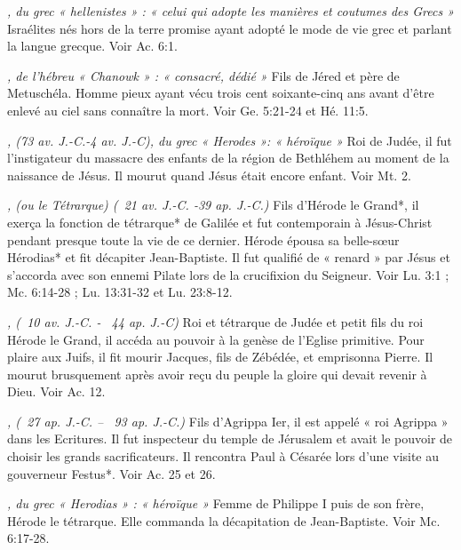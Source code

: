 \begin{multicols}{2}
{\textit{, du grec « hellenistes » : « celui qui adopte les manières et coutumes des Grecs »}\newline
Israélites nés hors de la terre promise ayant adopté le mode de vie grec et parlant la langue grecque. Voir Ac. 6:1.

\textit{, de l'hébreu « Chanowk » : « consacré, dédié »}\newline
Fils de Jéred et père de Metuschéla. Homme pieux ayant vécu trois cent soixante-cinq ans avant d'être enlevé au ciel sans connaître la mort. Voir Ge. 5:21-24 et Hé. 11:5.

\textit{, (73 av. J.-C.-4 av. J.-C), du grec « Herodes »: « héroïque »}\newline
Roi de Judée, il fut l'instigateur du massacre des enfants de la région de Bethléhem au moment de la naissance de Jésus. Il mourut quand Jésus était encore enfant. Voir Mt. 2.

\textit{, (ou le Tétrarque) (\ 21 av. J.-C. -39 ap. J.-C.)}\newline
Fils d'Hérode le Grand*, il exerça la fonction de tétrarque* de Galilée et fut contemporain à Jésus-Christ pendant presque toute la vie de ce dernier. Hérode épousa sa belle-sœur Hérodias* et fit décapiter Jean-Baptiste. Il fut qualifié de « renard » par Jésus et s'accorda avec son ennemi Pilate lors de la crucifixion du Seigneur. Voir Lu. 3:1 ; Mc. 6:14-28 ; Lu. 13:31-32 et Lu. 23:8-12.

\textit{, (\ 10 av. J.-C. - \ 44 ap. J.-C)}\newline
Roi et tétrarque de Judée et petit fils du roi Hérode le Grand, il accéda au pouvoir à la genèse de l'Eglise primitive. Pour plaire aux Juifs, il fit mourir Jacques, fils de Zébédée, et emprisonna Pierre. Il mourut brusquement après avoir reçu du peuple la gloire qui devait revenir à Dieu. Voir Ac. 12.

\textit{, (\ 27 ap. J.-C. – \ 93 ap. J.-C.)}\newline
Fils d'Agrippa Ier, il est appelé « roi Agrippa » dans les Ecritures. Il fut inspecteur du temple de Jérusalem et avait le pouvoir de choisir les grands sacrificateurs. Il rencontra Paul à Césarée lors d'une visite au gouverneur Festus*. Voir Ac. 25 et 26.

\textit{, du grec « Herodias » : « héroïque »}\newline
Femme de Philippe I puis de son frère, Hérode le tétrarque. Elle commanda la décapitation de Jean-Baptiste. Voir Mc. 6:17-28.

}
\end{multicols}

